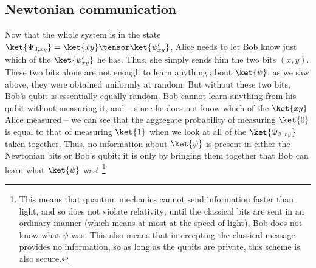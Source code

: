 \subsection{Newtonian communication}\label{sec:newtonian-communication}
Now that the whole system is in the state $\ket{\Psi_{3,xy}} =
\ket{xy}\tensor\ket{\psi'_{xy}}$, Alice needs to let Bob know just which of the
$\ket{\psi'_{xy}}$ he has.  Thus, she simply sends him the two bits $(x,y)$.
These two bits alone are not enough to learn anything about $\ket{\psi}$; as we
saw above, they were obtained uniformly at random.  But without these two bits,
Bob's qubit is essentially equally random.  Bob cannot learn anything from his
qubit without measuring it, and -- since he does not know which of the
$\ket{xy}$ Alice measured -- we can see that the aggregate probability of
measuring $\ket{0}$ is equal to that of measuring $\ket{1}$ when we look at all
of the $\ket{\Psi_{3,xy}}$ taken together.  Thus, no information about
$\ket{\psi}$ is present in either the Newtonian bits or Bob's qubit; it is only
by bringing them together that Bob can learn what $\ket{\psi}$ was!%
\footnote{This means that quantum mechanics cannot send information faster than
  light, and so does not violate relativity; until the classical bits are sent
  in an ordinary manner (which means at most at the speed of light), Bob does
  not know what $\psi$ was.  This also means that intercepting the classical
  message provides no information, so as long as the qubits are private, this
  scheme is also secure.}

